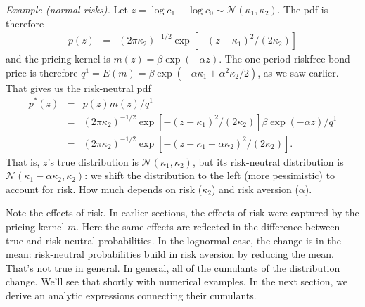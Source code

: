 \documentclass[11pt]{article}
\begin{document}
{\it Example (normal risks).\/}
Let $ z = \log c_1 - \log c_0 \sim \mathcal{N}(\kappa_1, \kappa_2) $.
The pdf is therefore
\begin{eqnarray*}
    p(z) &=& (2 \pi \kappa_2)^{-1/2} \exp[ - (z-\kappa_1)^2/(2\kappa_2)]
\end{eqnarray*}
and the pricing kernel is $m(z) = \beta \exp(-\alpha z)$.
The one-period riskfree bond price is therefore
$ q^1 = E(m) = \beta \exp(-\alpha \kappa_1 + \alpha^2 \kappa_2/2)$,
as we saw earlier.
That gives us the risk-neutral pdf
\begin{eqnarray*}
    p^*(z)  &=& p(z) m (z) /q^1 \\
            &=& (2 \pi \kappa_2)^{-1/2} \exp[ - (z-\kappa_1)^2/(2\kappa_2)]
                        \beta \exp(-\alpha z)/q^1 \\
            &=& (2 \pi \kappa_2)^{-1/2} \exp[ - (z-\kappa_1+\alpha \kappa_2)^2/(2\kappa_2)] .
\end{eqnarray*}
That is, $z$'s true distribution is $\mathcal{N}(\kappa_1,\kappa_2)$,
but its risk-neutral distribution is $\mathcal{N}(\kappa_1-\alpha \kappa_2,\kappa_2)$:
we shift the distribution to the left (more pessimistic) to account
for risk.  How much depends on risk ($\kappa_2$) and risk aversion ($\alpha$).


Note the effects of risk.
In earlier sections, the effects of risk were captured by the pricing kernel $m$.
Here the same effects are reflected in the difference between
true and risk-neutral probabilities.
In the lognormal case, the change is in the mean:  risk-neutral
probabilities build in risk aversion by reducing the mean.
That's not true in general.
In general, all of the cumulants of the distribution change.
We'll see that shortly with numerical examples.
In the next section, we derive an analytic expressions connecting
their cumulants.
\end{document}
